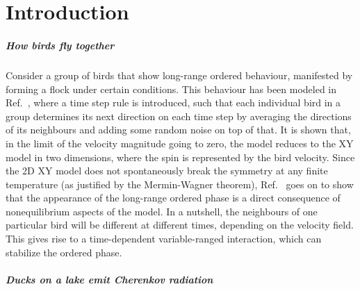 \chapter{Introduction}



\paragraph{How birds fly together}
Consider a group of birds that show long-range ordered behaviour,
manifested by forming a flock under certain conditions. This behaviour
has been modeled in Ref.~\cite{Toner1995}, where a time step rule is
introduced, such that each individual bird in a group determines its
next direction on each time step by averaging the directions of its
neighbours and adding some random noise on top of that. It is shown
that, in the limit of the velocity magnitude going to zero, the model
reduces to the XY model in two dimensions, where the spin is
represented by the bird velocity. Since the 2D XY model does not
spontaneously break the symmetry at any finite temperature (as
justified by the Mermin-Wagner theorem), Ref.~\cite{Toner1995} goes on
to show that the appearance of the long-range ordered phase is a
direct consequence of nonequilibrium aspects of the model. In a
nutshell, the neighbours of one particular bird will be different at
different times, depending on the velocity field. This gives rise to a
time-dependent variable-ranged interaction, which can stabilize the
ordered phase.

\paragraph{Ducks on a lake emit Cherenkov radiation}



